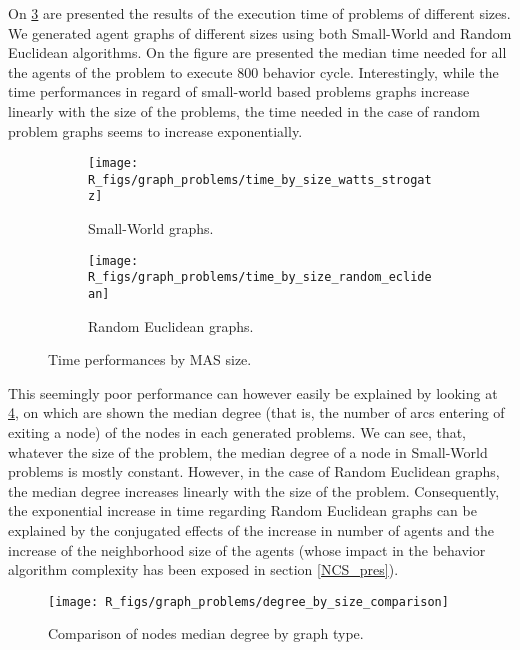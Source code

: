 On \figurename{} \ref{time_by_size_perfo} are presented the results of the execution time of problems of different sizes. We generated agent graphs of different sizes using both Small-World and Random Euclidean algorithms. On the figure are presented the median time needed for all the agents of the problem to execute 800 behavior cycle. Interestingly, while the time performances in regard of small-world based problems graphs increase linearly with the size of the problems, the time needed in the case of random problem graphs seems to increase exponentially.

\begin{figure}
\centering

	\begin{subfigure}[b]{0.45\textwidth}
		\texttt{[image: R\_figs/graph\_problems/time\_by\_size\_watts\_strogatz]}
		\caption{Small-World graphs.}\label{time_by_size_perfo:ws}
	\end{subfigure}
	\begin{subfigure}[b]{0.45\textwidth}
			\texttt{[image: R\_figs/graph\_problems/time\_by\_size\_random\_eclidean]}
		\caption{Random Euclidean graphs.}\label{time_by_size_perfo:re}
	\end{subfigure}

\caption{Time performances by MAS size.}\label{time_by_size_perfo}
\end{figure}

This seemingly poor performance can however easily be explained by looking at \figurename{} \ref{degree_by_size}, on which are shown the median degree (that is, the number of arcs entering of exiting a node) of the nodes in each generated problems. We can see, that, whatever the size of the problem, the median degree of a node in Small-World problems is mostly constant. However, in the case of Random Euclidean graphs, the median degree increases linearly with the size of the problem. Consequently, the exponential increase in time regarding Random Euclidean graphs can be explained by the conjugated effects of the increase in number of agents and the increase of the neighborhood size of the agents (whose impact in the behavior algorithm complexity has been exposed in section \ref{NCS_pres}).

\begin{figure}
\centering
			\texttt{[image: R\_figs/graph\_problems/degree\_by\_size\_comparison]}
\caption{Comparison of nodes median degree by graph type.}\label{degree_by_size}
\end{figure}

